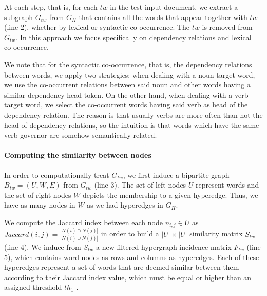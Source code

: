 At each step, that is, for each $tw$ in the test input document, we extract a subgraph $G_{tw}$ from $G_H$ that contains all the words that appear together with $tw$ (line 2), whether by lexical or syntactic co-occurrence. The $tw$ is removed from $G_{tw}$. In this approach we focus specifically on dependency relations and lexical co-occurrence. 

We note that for the syntactic co-occurrence, that is, the dependency relations between words, we apply two strategies: when dealing with a noun target word, we use the co-occurrent relations between said noun and other words having a similar  dependency head token. On the other hand, when dealing with a verb target word, we select the co-occurrent words having said verb as head of the dependency relation.  The reason is that usually verbs are more often than not the head of dependency relations, so the intuition is that words which have the same verb governor are somehow semantically related. %

\paragraph{Computing the similarity between nodes}
In order to computationally treat $G_{tw}$, we first induce a bipartite graph $B_{tw}=(U,W,E)$ from $G_{tw}$ (line 3). The set of left nodes $U$ represent words and the set of right nodes $W$ depicts the membership to a given hyperedge. Thus, we have as many nodes in $W$  as we had hyperedges in $G_H$.

We compute the Jaccard index between each node $n_{i,j} \in U$ as $Jaccard(i,j)=\frac{|N(i)\cap N(j)|}{|N(i)\cup N(j)|}$ in order to build a $|U|\times|U|$ similarity matrix $S_{tw}$ (line 4). We induce from $S_{tw}$ a new filtered  hypergraph incidence matrix $F_{tw}$ (line 5), which contains word nodes as rows and columns as hyperedges. Each of these hyperedges represent a set of words that are deemed similar between them according to their Jaccard  index value, which must be equal or higher than an assigned threshold $th_1$ .  

